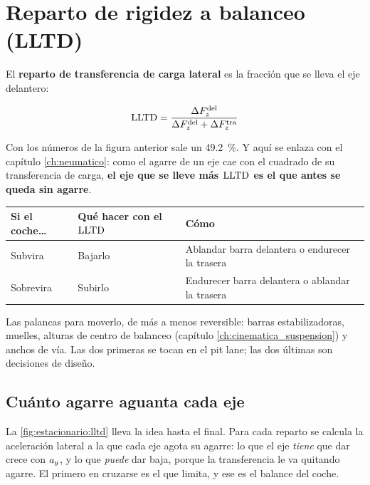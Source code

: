 \section{Reparto de rigidez a balanceo (LLTD)}
\label{sec:regimen_estacionario:04}

El \textbf{reparto de transferencia de carga lateral} es la fracción que se
lleva el eje delantero:

\begin{equation}
  \mathrm{LLTD} = \frac{\Delta F_z^{\text{del}}}
               {\Delta F_z^{\text{del}} + \Delta F_z^{\text{tra}}}
  \label{eq:lltd}
\end{equation}

Con los números de la figura anterior sale un \SI{49.2}{\percent}. Y aquí se
enlaza con el capítulo \ref{ch:neumatico}: como el agarre de un eje cae con el
cuadrado de su transferencia de carga, \textbf{el eje que se lleve más $\mathrm{LLTD}$
es el que antes se queda sin agarre}.

\begin{center}
\begin{tabularx}{\textwidth}{@{}lXX@{}}
\toprule
\textbf{Si el coche\ldots} & \textbf{Qué hacer con el $\mathrm{LLTD}$} & \textbf{Cómo} \\
\midrule
Subvira & Bajarlo & Ablandar barra delantera o endurecer la trasera \\
Sobrevira & Subirlo & Endurecer barra delantera o ablandar la trasera \\
\bottomrule
\end{tabularx}
\end{center}

Las palancas para moverlo, de más a menos reversible: barras estabilizadoras,
muelles, alturas de centro de balanceo (capítulo
\ref{ch:cinematica_suspension}) y anchos de vía. Las dos primeras se tocan en
el pit lane; las dos últimas son decisiones de diseño.

\subsection{Cuánto agarre aguanta cada eje}

La \cref{fig:estacionario:lltd} lleva la idea hasta el final. Para cada reparto
se calcula la aceleración lateral a la que cada eje agota su agarre: lo que el
eje \emph{tiene} que dar crece con $a_y$, y lo que \emph{puede} dar baja,
porque la transferencia le va quitando agarre. El primero en cruzarse es el que
limita, y ese es el balance del coche.

